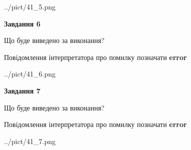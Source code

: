 \documentclass[10pt, ukrainian]{article}
\begin{document}
{\begin {large}
\begin{center}
	{../pict/41_5.png}
\end{center}
\newpage

{\begin {center}\textbf{Завдання 6}\end {center}}\par
Що буде виведено за виконання? \par
Повідомлення інтерпретатора про помилку позначати \textbf{error}

\begin{center}
	{../pict/41_6.png}
\end{center}
\newpage

{\begin {center}\textbf{Завдання 7}\end {center}}\par
Що буде виведено за виконання? \par
Повідомлення інтерпретатора про помилку позначати \textbf{error}

\begin{center}
	{../pict/41_7.png}
\end{center}
\newpage

\end {large}}
\end{document}
